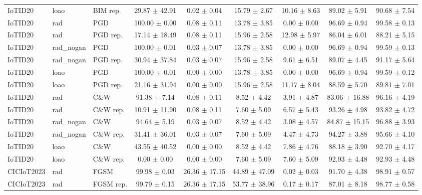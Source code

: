 \begin{table}[t]
\begin{tabular}{lllcccccc}
IoTID20 & loao & BIM rep. & 29.87 $\pm$ 42.91 & 0.02 $\pm$ 0.04 & 15.79 $\pm$ 2.67 & 10.16 $\pm$ 8.63 & 89.02 $\pm$ 5.91 & 90.68 $\pm$ 7.54 \\
IoTID20 & rad & PGD & 100.00 $\pm$ 0.00 & 0.08 $\pm$ 0.11 & 13.78 $\pm$ 3.85 & 0.00 $\pm$ 0.00 & 96.69 $\pm$ 0.94 & 99.58 $\pm$ 0.13 \\
IoTID20 & rad & PGD rep. & 17.14 $\pm$ 18.49 & 0.08 $\pm$ 0.11 & 15.96 $\pm$ 2.58 & 12.98 $\pm$ 5.97 & 86.04 $\pm$ 6.01 & 88.21 $\pm$ 5.15 \\
IoTID20 & rad\_nogan & PGD & 100.00 $\pm$ 0.01 & 0.03 $\pm$ 0.07 & 13.78 $\pm$ 3.85 & 0.00 $\pm$ 0.00 & 96.69 $\pm$ 0.94 & 99.59 $\pm$ 0.13 \\
IoTID20 & rad\_nogan & PGD rep. & 30.94 $\pm$ 37.84 & 0.03 $\pm$ 0.07 & 15.96 $\pm$ 2.58 & 9.61 $\pm$ 6.51 & 89.07 $\pm$ 4.45 & 91.17 $\pm$ 5.64 \\
IoTID20 & loao & PGD & 100.00 $\pm$ 0.01 & 0.00 $\pm$ 0.00 & 13.78 $\pm$ 3.85 & 0.00 $\pm$ 0.00 & 96.69 $\pm$ 0.94 & 99.59 $\pm$ 0.12 \\
IoTID20 & loao & PGD rep. & 21.16 $\pm$ 31.94 & 0.00 $\pm$ 0.00 & 15.96 $\pm$ 2.58 & 11.17 $\pm$ 8.04 & 88.59 $\pm$ 5.70 & 89.81 $\pm$ 7.01 \\
IoTID20 & rad & C\&W & 91.38 $\pm$ 7.14 & 0.08 $\pm$ 0.11 & 8.52 $\pm$ 4.42 & 3.91 $\pm$ 4.87 & 83.06 $\pm$ 16.88 & 96.16 $\pm$ 4.19 \\
IoTID20 & rad & C\&W rep. & 10.91 $\pm$ 11.90 & 0.08 $\pm$ 0.11 & 7.60 $\pm$ 5.09 & 6.57 $\pm$ 5.43 & 93.26 $\pm$ 4.98 & 93.82 $\pm$ 4.72 \\
IoTID20 & rad\_nogan & C\&W & 94.64 $\pm$ 5.19 & 0.03 $\pm$ 0.07 & 8.52 $\pm$ 4.42 & 3.08 $\pm$ 4.57 & 84.87 $\pm$ 15.15 & 96.88 $\pm$ 3.93 \\
IoTID20 & rad\_nogan & C\&W rep. & 31.41 $\pm$ 36.01 & 0.03 $\pm$ 0.07 & 7.60 $\pm$ 5.09 & 4.47 $\pm$ 4.73 & 94.27 $\pm$ 3.88 & 95.66 $\pm$ 4.10 \\
IoTID20 & loao & C\&W & 43.55 $\pm$ 40.52 & 0.00 $\pm$ 0.00 & 8.52 $\pm$ 4.42 & 7.86 $\pm$ 4.76 & 88.18 $\pm$ 3.90 & 92.70 $\pm$ 4.17 \\
IoTID20 & loao & C\&W rep. & 0.00 $\pm$ 0.00 & 0.00 $\pm$ 0.00 & 7.60 $\pm$ 5.09 & 7.60 $\pm$ 5.09 & 92.93 $\pm$ 4.48 & 92.93 $\pm$ 4.48 \\
CICIoT2023 & rad & FGSM & 99.98 $\pm$ 0.03 & 26.36 $\pm$ 17.15 & 44.89 $\pm$ 47.09 & 0.02 $\pm$ 0.03 & 91.70 $\pm$ 4.38 & 98.91 $\pm$ 0.57 \\
CICIoT2023 & rad & FGSM rep. & 99.79 $\pm$ 0.15 & 26.36 $\pm$ 17.15 & 53.77 $\pm$ 38.96 & 0.17 $\pm$ 0.17 & 87.01 $\pm$ 8.18 & 98.77 $\pm$ 0.58 \\

\end{tabular}
\end{table}
